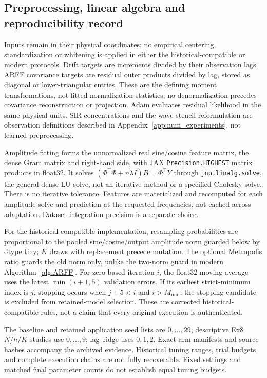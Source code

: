 \subsection{Preprocessing, linear algebra and reproducibility record}
Inputs remain in their physical coordinates: no empirical centering, standardization or whitening is applied in either the historical-compatible or modern protocols. Drift targets are increments divided by their observation lags. ARFF covariance targets are residual outer products divided by lag, stored as diagonal or lower-triangular entries. These are the defining moment transformations, not fitted normalization statistics; no denormalization precedes covariance reconstruction or projection. Adam evaluates residual likelihood in the same physical units. SIR concentrations and the wave-stencil reformulation are observation definitions described in Appendix~\ref{app:num_experiments}, not learned preprocessing.

Amplitude fitting forms the unnormalized real sine/cosine feature matrix, the dense Gram matrix and right-hand side, with JAX \texttt{Precision.HIGHEST} matrix products in float32. It solves $(\Phi^\top\Phi+n\lambda I)B=\Phi^\top Y$ through \texttt{jnp.linalg.solve}, the general dense LU solve, not an iterative method or a specified Cholesky solve. There is no iterative tolerance. Features are materialized and recomputed for each amplitude solve and prediction at the requested frequencies, not cached across adaptation. Dataset integration precision is a separate choice.

For the historical-compatible implementation, resampling probabilities are proportional to the pooled sine/cosine/output amplitude norm guarded below by dtype tiny; $K$ draws with replacement precede mutation. The optional Metropolis ratio guards the old norm only, unlike the two-norm guard in modern Algorithm~\ref{alg:ARFF}. For zero-based iteration $i$, the float32 moving average uses the latest $\min(i+1,5)$ validation errors. If its earliest strict-minimum index is $j$, stopping occurs when $j+5<i$ and $i>M_{\min}$; the stopping candidate is excluded from retained-model selection. These are corrected historical-compatible rules, not a claim that every original execution is authenticated.

The baseline and retained application seed lists are $0,\ldots,29$; descriptive Ex8 $N/h/K$ studies use $0,\ldots,9$; lag--ridge uses $0,1,2$. Exact arm manifests and source hashes accompany the archived evidence. Historical tuning ranges, trial budgets and complete execution chains are not fully recoverable. Fixed settings and matched final parameter counts do not establish equal tuning budgets.

